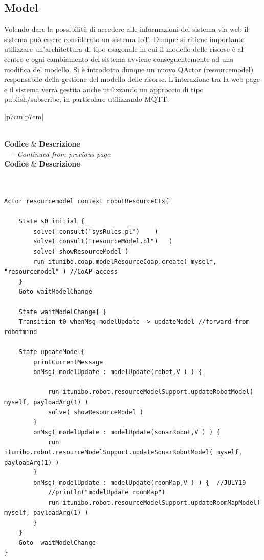 \subsection{Model} 
Volendo dare la possibilità di accedere alle informazioni del sistema via web il sistema può essere considerato un sistema IoT. Dunque si ritiene importante  utilizzare un'architettura di tipo esagonale in cui il modello delle risorse è al centro e ogni cambiamento del sistema avviene conseguentemente ad una modifica del modello. 
Si è introdotto dunque un nuovo QActor (resourcemodel) responsabile della gestione del modello delle risorse.
L'interazione tra la web page e il sistema verrà gestita anche utilizzando un approccio di tipo publish/subscribe, in particolare utilizzando MQTT.

\begin{center}
\begin{longtable}{|p{7cm}|p{7cm}|}
\caption{QActor resourcemodel in exploration.qak}
\label{tbl:technical-risks}\\
\hline
\textbf{Codice} & \textbf{Descrizione}  \\ 
\hline
\endfirsthead
{}
{\tablename\ \thetable\ -- \textit{Continued from previous page}} \\
\hline
\textbf{Codice} & \textbf{Descrizione}  \\ 
\hline
\endhead
\hline {} \\
\endfoot
\endlastfoot

\begin{lstlisting}[backgroundcolor=\color{white} ]

Actor resourcemodel context robotResourceCtx{

	State s0 initial {
		solve( consult("sysRules.pl")	 )
		solve( consult("resourceModel.pl")	 )
		solve( showResourceModel )
		run itunibo.coap.modelResourceCoap.create( myself, "resourcemodel" ) //CoAP access
	}
	Goto waitModelChange

	State waitModelChange{ }
	Transition t0 whenMsg modelUpdate -> updateModel //forward from robotmind

	State updateModel{
		printCurrentMessage
		onMsg( modelUpdate : modelUpdate(robot,V ) ) {
		
			run itunibo.robot.resourceModelSupport.updateRobotModel( myself, payloadArg(1) )
			solve( showResourceModel )
		}
		onMsg( modelUpdate : modelUpdate(sonarRobot,V ) ) {
			run itunibo.robot.resourceModelSupport.updateSonarRobotModel( myself, payloadArg(1) )
		}
		onMsg( modelUpdate : modelUpdate(roomMap,V ) ) {  //JULY19
			//println("modelUpdate roomMap")
			run itunibo.robot.resourceModelSupport.updateRoomMapModel( myself, payloadArg(1) )
		}
	}
    Goto  waitModelChange
}




\end{lstlisting}
\end{longtable}
\end{center}
